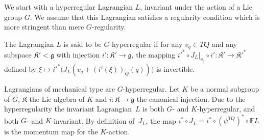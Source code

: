 \documentclass[11pt]{article}
\newcommand{\lag}{\mathfrak{g}}
\newcommand{\lak}{\mathfrak{K}}
\newcommand{\F}{\mathbb{F}}
\begin{document}
We start with a hyperregular Lagrangian $L$, invariant under the action of a Lie group $G$. We assume that this Lagrangian satisf\/ies a regularity condition which is more stringent than mere $G$-regularity.
\begin{definition} The Lagrangian $L$ is said to be $G$-hyperregular if for any $v_q\in TQ$ and any subspace $\lak' <\lag$ with injection $i':\lak'\to \lag$,  the mapping ${i'}^*\circ J_L|_{v_q}\circ i':\lak' \to \lak'^*$ def\/ined by $\xi \mapsto {i'}^*\big(J_L(v_q+(i'(\xi))_Q(q))\big)$ is invertible.
\end{definition}
Lagrangians of mechanical type are $G$-hyperregular. Let $K$ be a normal subgroup of $G$, $\lak$ the Lie algebra of $K$ and $i:\lak\to \lag$ the canonical injection. Due to the hyperregularity the invariant Lagrangian~$L$ is both $G$- and $K$-hyperregular, and both $G$- and $K$-invariant. By def\/inition of~$J_L$, the map $i^*\circ J_L= i^*\circ (\psi^{TQ})^*\circ \F L$ is the momentum map for the $K$-action.
\end{document}
